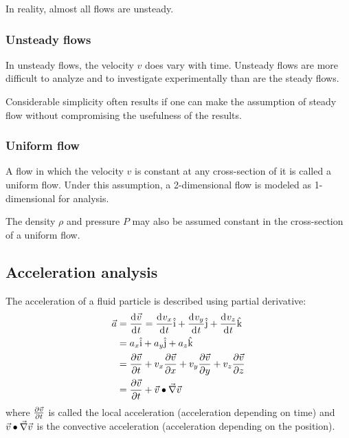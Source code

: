 \documentclass[10pt, twocolumn]{article}
\begin{document}
\begin{remark}
  In reality, almost all flows are unsteady.
\end{remark}


\subsubsection{Unsteady flows}
In unsteady flows, the velocity \(v\) does vary with time.
Unsteady flows are more difficult to analyze and to investigate experimentally than are the steady flows.

Considerable simplicity often results if one can make the assumption of steady flow without compromising the usefulness of the results.


\subsubsection{Uniform flow}
A flow in which the velocity \(v\) is constant at any cross-section of it is called a uniform flow.
Under this assumption, a 2-dimensional flow is modeled as 1-dimensional for analysis.

The density \(\rho\) and pressure \(P\) may also be assumed constant in the cross-section of a uniform flow.


\subsection{Acceleration analysis}
The acceleration of a fluid particle is described using partial derivative:
\begin{align*}
  \vec{a} & = \frac{\mathrm{d}^{} \vec{v}}{\mathrm{d}^{} t} = \frac{\mathrm{d}^{} v_x}{\mathrm{d}^{} t}\hat{\mathrm{i}} + \frac{\mathrm{d}^{} v_y}{\mathrm{d}^{} t}\hat{\mathrm{j}} + \frac{\mathrm{d}^{} v_z}{\mathrm{d}^{} t}\hat{\mathrm{k}}                                      \\
          & = a_x\hat{\mathrm{i}} + a_y\hat{\mathrm{j}} + a_z\hat{\mathrm{k}}                                                                                                                \\
          & = \frac{\partial \vec{v}}{\partial t} + v_x \frac{\partial \vec{v}}{\partial x} + v_y \frac{\partial \vec{v}}{\partial y} + v_z \frac{\partial \vec{v}}{\partial z} \\
          & = \frac{\partial \vec{v}}{\partial t} + \vec{v} \bullet \vec{\nabla}\vec{v}
\end{align*}
where \(\frac{\partial \vec{v}}{\partial t}\) is called the local acceleration (acceleration depending on time) and \(\vec{v} \bullet \vec{\nabla}\vec{v}\) is the convective acceleration (acceleration depending on the position).
\end{document}
